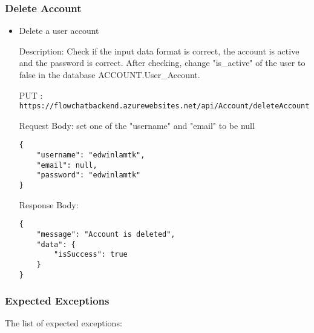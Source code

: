 \documentclass[11pt, a4paper]{article}
\begin{document}
\subsubsection{Delete Account}
\begin{itemize}
\item Delete a user account

Description: Check if the input data format is correct, the account is active and the password is correct. After checking, change "is\_active" of the user to false in the
database ACCOUNT.User\_Account.

PUT :  \texttt{https://flowchatbackend.azurewebsites.net/api/Account/deleteAccount}
    
Request Body: set one of the "username" and "email" to be null
    \begin{lstlisting}[breaklines=true, frame=single]
{
    "username": "edwinlamtk",
    "email": null,
    "password": "edwinlamtk"
}
    \end{lstlisting}

    Response Body:
    \begin{lstlisting}[breaklines=true, frame=single]
{
    "message": "Account is deleted",
    "data": {
        "isSuccess": true
    }
}
    \end{lstlisting}

\end{itemize}

\subsubsection{Expected Exceptions}
The list of expected exceptions: \\
\end{document}
